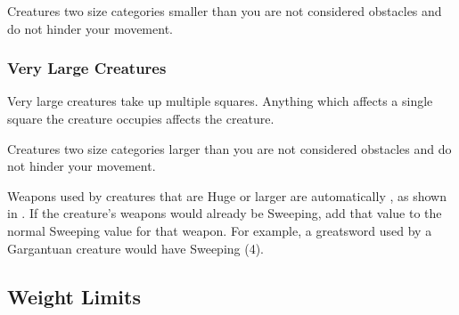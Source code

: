        Creatures two size categories smaller than you are not considered obstacles and do not hinder your movement.

    \subsubsection{Very Large Creatures}\label{Very Large Creatures}
       Very large creatures take up multiple squares. Anything which affects a single square the creature occupies affects the creature.

       Creatures two size categories larger than you are not considered obstacles and do not hinder your movement.

       Weapons used by creatures that are Huge or larger are automatically , as shown in .
      If the creature's weapons would already be Sweeping, add that value to the normal Sweeping value for that weapon.
      For example, a greatsword used by a Gargantuan creature would have Sweeping (4).

  \subsection{Weight Limits}\label{Weight Limits}

